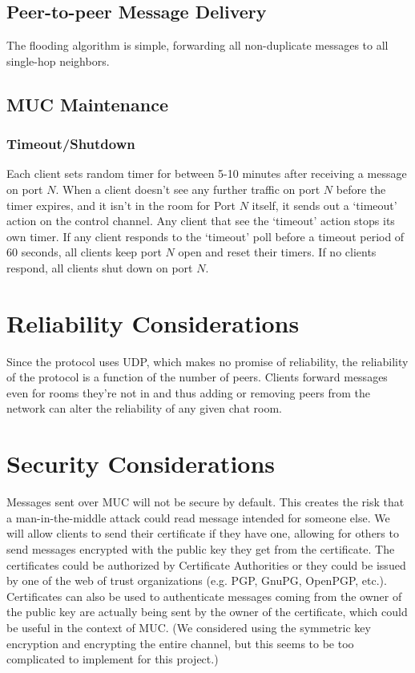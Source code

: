 \documentclass{article}
\begin{document}
\subsection{Peer-to-peer Message Delivery}

The flooding algorithm is simple, forwarding all non-duplicate messages to all
single-hop neighbors.

\subsection{MUC Maintenance}

\subsubsection{Timeout/Shutdown}

Each client sets random timer for between 5-10 minutes after receiving a message
on port $N$. When a client doesn't see any further traffic on port $N$ before the
timer expires, and it isn't in the room for Port $N$ itself, it sends out a
`timeout' action on the control channel. Any client that see the `timeout'
action stops its own timer. If any client responds to the `timeout' poll before
a timeout period of 60 seconds, all clients keep port $N$ open and reset their
timers. If no clients
respond, all clients shut down on port $N$.

\section{Reliability Considerations}

Since the protocol uses UDP, which makes no promise of reliability, the
reliability of the protocol is a function of the number of peers. Clients
forward messages even for rooms they're not in and thus adding or removing peers
from the network can alter the reliability of any given chat room.

\section{Security Considerations}

Messages sent over MUC will not be secure by default. This creates the risk that
a man-in-the-middle attack could read message intended for someone else.  We
will allow clients to send their certificate if they have one, allowing for
others to send messages encrypted with the public key they get from the
certificate. The certificates could be authorized by Certificate Authorities or
they could be issued by one of the web of trust organizations (e.g. PGP, GnuPG,
OpenPGP, etc.). Certificates can also be used to authenticate messages coming
from the owner of the public key are actually being sent by the owner of the
certificate, which could be useful in the context of MUC.  (We considered using
the symmetric key encryption and encrypting the entire channel, but this seems
to be too complicated to implement for this project.)
\end{document}

